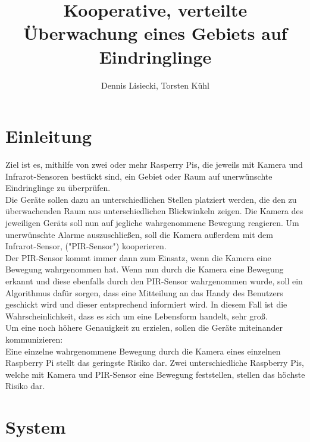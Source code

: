 \documentclass[journal]{IEEEtran}
\title{Kooperative, verteilte Überwachung eines Gebiets auf Eindringlinge}		%
\author{Dennis Lisiecki, Torsten Kühl}								%
\begin{document}

\maketitle	%




\section{Einleitung} 
Ziel ist es, mithilfe von zwei oder mehr Rasperry Pis, die jeweils mit Kamera und Infrarot-Sensoren bestückt sind, ein Gebiet oder Raum auf unerwünschte Eindringlinge zu überprüfen.\\ Die Geräte sollen dazu an unterschiedlichen Stellen platziert werden, die den zu überwachenden Raum aus unterschiedlichen Blickwinkeln zeigen. Die Kamera des jeweiligen Geräts soll nun auf jegliche wahrgenommene Bewegung reagieren. Um unerwünschte Alarme auszuschließen, soll die Kamera außerdem mit dem Infrarot-Sensor, ("PIR-Sensor") kooperieren. \\  Der PIR-Sensor kommt immer dann zum Einsatz, wenn die Kamera eine Bewegung wahrgenommen hat. Wenn nun durch die Kamera eine Bewegung erkannt und diese ebenfalls durch den PIR-Sensor wahrgenommen wurde, soll ein Algorithmus dafür sorgen, dass eine Mitteilung an das Handy des Benutzers geschickt wird und dieser entsprechend informiert wird. In diesem Fall ist die Wahrscheinlichkeit, dass es sich um eine Lebensform handelt, sehr groß.\\ Um eine noch höhere Genauigkeit zu erzielen, sollen die Geräte miteinander kommunizieren:\\ Eine einzelne wahrgenommene Bewegung durch die Kamera eines einzelnen Raspberry Pi stellt das geringste Risiko dar. Zwei unterschiedliche Raspberry Pis, welche mit Kamera und PIR-Sensor eine Bewegung feststellen, stellen das höchste Risiko dar. 




\section{System}
\end{document}
